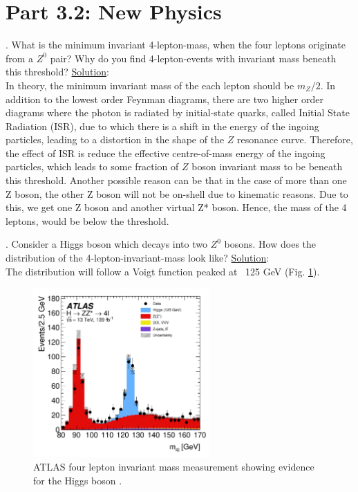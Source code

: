 \documentclass[a4paper]{report}
\numberwithin{equation}{section}
\begin{document}
\section{Part 3.2: New Physics}

. What is the minimum invariant 4-lepton-mass, when the four leptons originate from a $Z^0$ pair? Why do you find 4-lepton-events with invariant mass beneath this threshold?
\bigbreak
\noindent \underline{Solution}: \\
\noindent In theory, the minimum invariant mass of the each lepton should be $m_Z / 2$. In addition to the lowest order Feynman diagrams, there are two higher order diagrams where the photon is radiated by initial-state quarks, called Initial State Radiation (ISR), due to which there is a shift in the energy of the ingoing particles, leading to a distortion in the shape of the $Z$ resonance curve. Therefore, the effect of ISR is reduce the effective centre-of-mass energy of the ingoing particles, which leads to some fraction of $Z$ boson invariant mass to be beneath this threshold. 
Another possible reason can be that in the case of more than one Z boson, the other Z boson will not be on-shell due to kinematic reasons. Due to this, we get one Z boson and another virtual Z* boson. Hence, the mass of the 4 leptons, would be below the threshold. 

\bigbreak

. Consider a Higgs boson which decays into two $Z^0$ bosons. How does the distribution of the 4-lepton-invariant-mass look like?
\bigbreak
\noindent \underline{Solution}: \\
\noindent The distribution will follow a Voigt function peaked at ~125 GeV (Fig. \ref{fig:higgs-decay}).

\begin{figure}[htpb]
    \centering
    \includegraphics[width=0.6\textwidth]{higgs-decay}
    \caption{ATLAS four lepton invariant mass measurement showing evidence for the Higgs boson \cite{ATLAS:2020wny}.}
    \label{fig:higgs-decay}
\end{figure}
\end{document}
